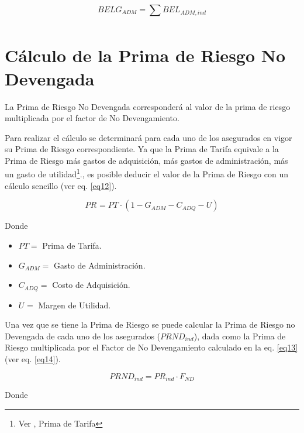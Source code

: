 \documentclass[11pt,twoside,openright,spanish]{report}
\numberwithin{equation}{chapter}
\numberwithin{figure}{chapter}
\numberwithin{table}{chapter}
\begin{document}
\begin{equation}
	BELG_{ADM}=\sum _{}^{}BEL_{ADM,ind}^{}
	\label{eq11}
\end{equation}



	\section{Cálculo de la Prima de Riesgo No Devengada}


La Prima de Riesgo No Devengada corresponderá al valor de la prima de riesgo multiplicada por el factor de No Devengamiento.

Para realizar el cálculo se determinará para cada uno de los asegurados en vigor su Prima de Riesgo correspondiente. Ya que la Prima de Tarifa equivale a la Prima de Riesgo más gastos de adquisición, más gastos de administración, más un gasto de utilidad\footnote{Ver \citet{TZurich}, Prima de Tarifa}., es posible deducir el valor de la Prima de Riesgo con un cálculo sencillo (ver eq. \ref{eq12}).


\begin{equation}
	{PR}_{}^{}={{PT}_{}\cdot(1-G_{ADM}-C_{ADQ}-U)}
	\label{eq12}
\end{equation}


Donde


\begin{itemize}
	\setlength\itemsep{-0.5em}
	\item $PT=$ Prima de Tarifa.
	
	\item $G_{ADM}^{}=$ Gasto de Administración.
	
	\item $C_{ADQ}^{}=$ Costo de Adquisición.
	
	\item $U_{}^{}=$ Margen de Utilidad.
\end{itemize}


Una vez que se tiene la Prima de Riesgo se puede calcular la Prima de Riesgo no Devengada de cada uno de los asegurados ($PRND_{ind}$), dada como la Prima de Riesgo multiplicada por el Factor de No Devengamiento calculado en la eq. \ref{eq13} (ver eq. \ref{eq14}).	


\begin{equation}
	{PRND}_{ind}^{}={{PR}_{ind}\cdot F_{ND}}
	\label{eq14}
\end{equation}



Donde
\end{document}

